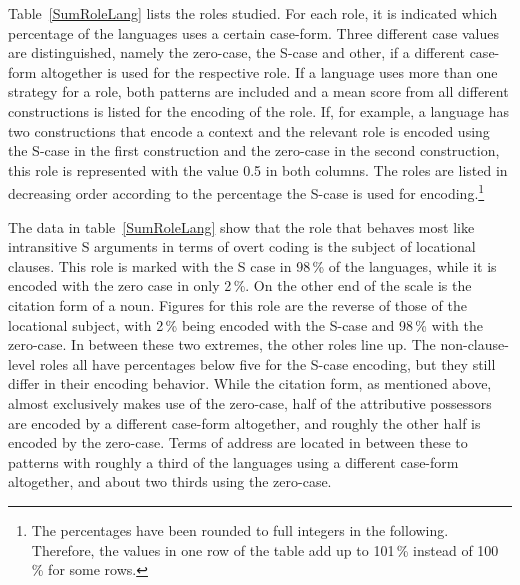 Table~\ref{SumRoleLang} lists the roles studied. 
For each role, it is indicated which percentage of the languages uses a certain case-form. 
Three different case values are distinguished, namely the zero-case, the S-case and other, if a different case-form altogether is used for the respective role. 
If a language uses more than one strategy for a role, both patterns are included and a mean score from all different constructions is listed for the encoding of the role. 
If, for example, a language has two constructions that encode a context and the relevant role is encoded using the S-case in the first construction and the zero-case in the second construction, this role is represented with the value 0.5 in both columns.  
The roles are listed in decreasing order according to the percentage the S-case is used for encoding.\footnote{The percentages have been rounded to full integers in the following. Therefore, the values in one row of the table add up to 101\,\% instead of 100\,\% for some rows.}

The data in table~\ref{SumRoleLang} show that the role that behaves most like intransitive S arguments in terms of overt coding is the subject of locational clauses. 
This role is marked with the S case in 98\,\% of the languages, while it is encoded with the zero case in only 2\,\%. 
On the other end of the scale is the citation form of a noun. 
Figures for this role are the reverse of those of the locational subject, with 2\,\% being encoded with the S-case and 98\,\% with the zero-case. 
In between these two extremes, the other roles line up. 
The non-clause-level roles all have percentages below five for the S-case encoding, but they still differ in their encoding behavior. 
While the citation form, as mentioned above, almost exclusively makes use of the zero-case, half of the attributive possessors are encoded by a different case-form altogether, and roughly the other half is encoded by the zero-case. 
Terms of address are located in between these to patterns with roughly a third of the languages using a different case-form altogether, and about two thirds using the zero-case. 
 
